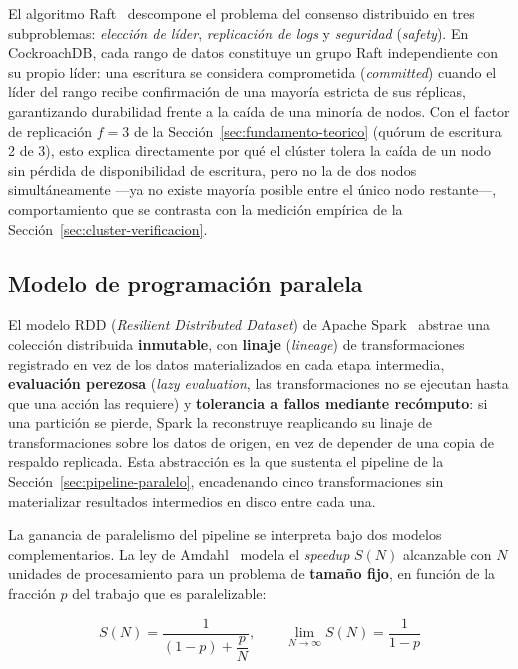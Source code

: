\documentclass[11pt,letterpaper]{article}
\begin{document}
El algoritmo Raft~\cite{ongaro2014raft} descompone el problema del consenso distribuido en tres
subproblemas: \emph{elección de líder}, \emph{replicación de logs} y \emph{seguridad}
(\emph{safety}). En CockroachDB, cada rango de datos constituye un grupo Raft independiente con su
propio líder: una escritura se considera comprometida (\emph{committed}) cuando el líder del rango
recibe confirmación de una mayoría estricta de sus réplicas, garantizando durabilidad frente a la
caída de una minoría de nodos. Con el factor de replicación $f=3$ de la
Sección~\ref{sec:fundamento-teorico} (quórum de escritura 2 de 3), esto explica directamente por
qué el clúster tolera la caída de un nodo sin pérdida de disponibilidad de escritura, pero no la
de dos nodos simultáneamente —ya no existe mayoría posible entre el único nodo restante—,
comportamiento que se contrasta con la medición empírica de la
Sección~\ref{sec:cluster-verificacion}.

\subsection{Modelo de programación paralela}

El modelo RDD (\emph{Resilient Distributed Dataset}) de Apache Spark~\cite{zaharia2012rdd} abstrae
una colección distribuida \textbf{inmutable}, con \textbf{linaje} (\emph{lineage}) de
transformaciones registrado en vez de los datos materializados en cada etapa intermedia,
\textbf{evaluación perezosa} (\emph{lazy evaluation}, las transformaciones no se ejecutan hasta que
una acción las requiere) y \textbf{tolerancia a fallos mediante recómputo}: si una partición se
pierde, Spark la reconstruye reaplicando su linaje de transformaciones sobre los datos de origen,
en vez de depender de una copia de respaldo replicada. Esta abstracción es la que sustenta el
pipeline de la Sección~\ref{sec:pipeline-paralelo}, encadenando cinco transformaciones sin
materializar resultados intermedios en disco entre cada una.

La ganancia de paralelismo del pipeline se interpreta bajo dos modelos complementarios. La ley de
Amdahl~\cite{amdahl1967validity} modela el \emph{speedup} $S(N)$ alcanzable con $N$ unidades de
procesamiento para un problema de \textbf{tamaño fijo}, en función de la fracción $p$ del trabajo
que es paralelizable:

\begin{equation}
    S(N) = \frac{1}{(1-p) + \dfrac{p}{N}}, \qquad \lim_{N \to \infty} S(N) = \frac{1}{1-p}
    \label{eq:amdahl}
\end{equation}
\end{document}
